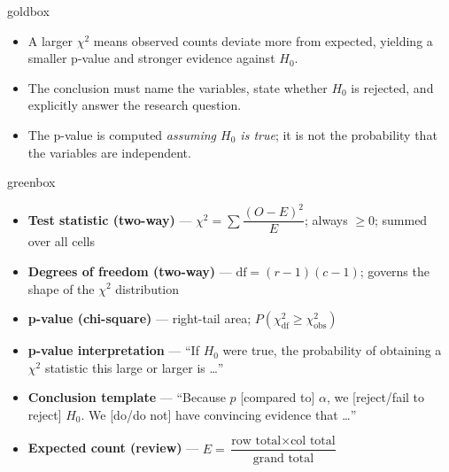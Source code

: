 \documentclass[10pt]{article}
\begin{document}
\begin{skillbox}{goldbox}
\begin{minipage}[t]{0.48\linewidth}
\begin{itemize}
        \item A larger $\chi^2$ means observed counts deviate more from expected,
              yielding a smaller p-value and stronger evidence against $H_0$.
        \item The conclusion must name the variables, state whether $H_0$ is rejected,
              and explicitly answer the research question.
        \item The p-value is computed \emph{assuming $H_0$ is true}; it is not the
              probability that the variables are independent.
    \end{itemize}
\end{minipage}
\end{skillbox}

\begin{skillbox}{greenbox}
\begin{minipage}[t]{0.48\linewidth}
    \begin{itemize}
        \item \textbf{Test statistic (two-way)} ---
              $\chi^2 = \sum \dfrac{(O-E)^2}{E}$; always $\ge 0$; summed over all cells
        \item \textbf{Degrees of freedom (two-way)} ---
              $\text{df} = (r-1)(c-1)$; governs the shape of the $\chi^2$ distribution
        \item \textbf{p-value (chi-square)} ---
              right-tail area; $P(\chi^2_{\text{df}} \ge \chi^2_{\text{obs}})$
    \end{itemize}
\end{minipage}
\hfill
\begin{minipage}[t]{0.48\linewidth}
    \begin{itemize}
        \item \textbf{p-value interpretation} --- ``If $H_0$ were true, the probability
              of obtaining a $\chi^2$ statistic this large or larger is \ldots''
        \item \textbf{Conclusion template} --- ``Because $p$ [compared to] $\alpha$,
              we [reject/fail to reject] $H_0$. We [do/do not] have convincing evidence
              that \ldots''
        \item \textbf{Expected count (review)} ---
              $E = \dfrac{\text{row total} \times \text{col total}}{\text{grand total}}$
    \end{itemize}
\end{minipage}
\end{skillbox}
\end{document}
